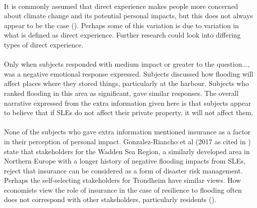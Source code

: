 \paragraph{}
It is commonly assumed that direct experience makes people more concerned about climate change and its potential personal impacts, but this does not always appear to be the case (\cite{lujala_role_2020}). Perhaps some of this variation is due to variation in what is defined as direct experience. Further research could look into differing types of direct experience. 
\paragraph{}
Only when subjects responded with medium impact or greater to the question..., was a negative emotional response expressed. Subjects discussed how flooding will affect places where they stored things, particularly at the harbour. Subjects who ranked flooding in this area as significant, gave similar responses. The overall narrative expressed from the extra information given here is that subjects appear to believe that if SLEs do not affect their private property, it will not affect them. 
\paragraph{}
None of the subjects who gave extra information mentioned insurance as a factor in their perception of personal impact.  Gonzalez-Riancho et al (2017 as cited in \cite{gerkensmeier_governing_2018}) state that stakeholders for the Wadden Sea Region, a similarly developed area in Northern Europe with a longer history of negative flooding impacts from SLEs, reject that insurance can be considered as a form of disaster risk management. Perhaps the self-selecting stakeholders for Trondheim have similar views. How economists view the role of insurance in the case of resilience to flooding often does not correspond with other stakeholders, particularly residents (\cite{gerkensmeier_governing_2018}).
\paragraph{}

